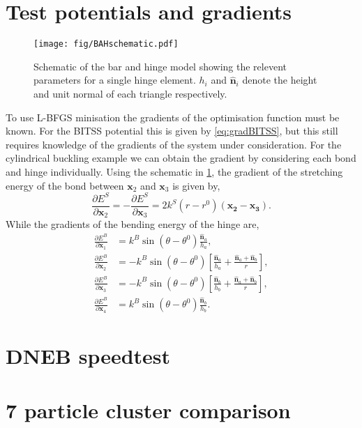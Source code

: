 \documentclass[aps,prl]{revtex4}
\begin{document}
\section{Test potentials and gradients}
\begin{figure}
  \texttt{[image: fig/BAHschematic.pdf]}
  \caption{\label{fig:BAHschematic}
    Schematic of the bar and hinge model showing the relevent parameters for a single hinge element. $h_i$ and $\bm{\hat{n}}_i$ denote the height and unit normal of each triangle respectively.
  }
\end{figure}
To use L-BFGS minisation the gradients of the optimisation function must be known.
For the BITSS potential this is given by \cref{eq:gradBITSS}, but this still requires knowledge of the gradients of the system under consideration.
For the cylindrical buckling example we can obtain the gradient by considering each bond and hinge individually.
Using the schematic in \cref{fig:BAHschematic}, the gradient of the stretching energy of the bond between $\bm{x}_2$ and $\bm{x}_3$ is given by,
\begin{equation}
  \frac{\partial E^S}{\partial \bm{x}_2} = - \frac{\partial E^S}{\partial \bm{x}_3} = 
    2 k^S (r - r^0) (\bm{x_2} - \bm{x_3}).
\end{equation}
While the gradients of the bending energy of the hinge are,
\begin{align}
  \frac{\partial E^B}{\partial \bm{x}_1} &= k^B \sin(\theta - \theta^0) \frac{\bm{\hat{n}}_a}{h_a}, \\
  \frac{\partial E^B}{\partial \bm{x}_2} &= - k^B \sin(\theta - \theta^0) \left[\frac{\bm{\hat{n}}_a}{h_a} + \frac{\bm{\hat{n}}_a + \bm{\hat{n}}_b}{r}\right], \\
  \frac{\partial E^B}{\partial \bm{x}_3} &= - k^B \sin(\theta - \theta^0) \left[\frac{\bm{\hat{n}}_b}{h_b} + \frac{\bm{\hat{n}}_a + \bm{\hat{n}}_b}{r}\right], \\
  \frac{\partial E^B}{\partial \bm{x}_4} &= k^B \sin(\theta - \theta^0) \frac{\bm{\hat{n}}_b}{h_b}.
\end{align}


\section{DNEB speedtest}


\section{7 particle cluster comparison}
\end{document}
